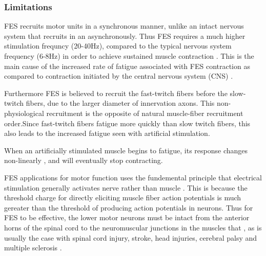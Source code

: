 \subsubsection{Limitations}
FES recruits motor units in a synchronous manner, unlike an intact nervous system that recruits in an asynchronously. Thus FES requires a much higher stimulation frequncy (20-40Hz), compared to the typical nervous system frequency (6-8Hz) in order to achieve sustained muscle contraction \cite{lynch_functional_2008}. This is the main cause of the increased rate of fatigue associated with FES contraction as compared to contraction initiated by the central nervous system (CNS) \cite{gilman_handbook_1983}. 

Furthermore FES is believed to recruit the fast-twitch fibers before the slow-twitch fibers, due to the larger diameter of innervation axons. This non-physiological recruitment is the opposite of natural muscle-fiber recruitment order.Since fast-twitch fibers fatigue more quickly than slow twitch fibers, this also leads to the increased fatigue seen with artificial stimulation. \cite{lynch_functional_2008}

When an artificially stimulated muscle begins to fatigue, its response changes non-linearly \cite{lynch_functional_2008}, and will eventually stop contracting. 

FES applications for motor function uses the fundemental principle that electrical stimulation generally activates nerve rather than muscle \cite{peckham_functional_2005}. This is because the threshold charge for directly eliciting muscle fiber action potentials is much gereater than the threshold of producing action potentials in neurons. Thus for FES to be effective, the lower motor neurons must be intact from the anterior horns of the spinal cord to the neuromuscular junctions in the muscles that , as is usually the case with spinal cord injury, stroke, head injuries, cerebral palsy and multiple sclerosis \cite{gregory_recruitment_2005}. 




